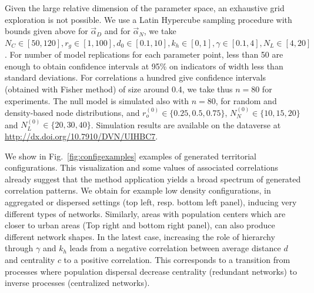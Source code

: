 \documentclass{article}
\begin{document}
Given the large relative dimension of the parameter space, an exhaustive grid exploration is not possible. We use a Latin Hypercube sampling procedure with bounds given above for $\vec{\alpha}_D$ and for $\vec{\alpha}_N$, we take $N_C \in [50,120], r_g \in [1,100] , d_0 \in [0.1,10] , k_h \in [0,1] , \gamma \in [0.1,4],N_L\in [4,20]$. For number of model replications for each parameter point, less than 50 are enough to obtain confidence intervals at 95\% on indicators of width less than standard deviations. For correlations a hundred give confidence intervals (obtained with Fisher method) of size around 0.4, we take thus $n=80$ for experiments. The null model is simulated also with $n=80$, for random and density-based node distributions, and $r_o^{(0)} \in \{0.25,0.5,0.75\}$, $N_N^{(0)} \in \{10,15,20\}$ and $N_L^{(0)} \in \{20,30,40\}$. Simulation results are available on the dataverse at \url{http://dx.doi.org/10.7910/DVN/UIHBC7}.


We show in Fig.~\ref{fig:configexamples} examples of generated territorial configurations. This visualization and some values of associated correlations already suggest that the method application yields a broad spectrum of generated correlation patterns. We obtain for example low density configurations, in aggregated or dispersed settings (top left, resp. bottom left panel), inducing very different types of networks. Similarly, areas with population centers which are closer to urban areas (Top right and bottom right panel), can also produce different network shapes. In the latest case, increasing the role of hierarchy through $\gamma$ and $k_h$ leads from a negative correlation between average distance $d$ and centrality $c$ to a positive correlation. This corresponds to a transition from processes where population dispersal decrease centrality (redundant networks) to inverse processes (centralized networks).
\end{document}
